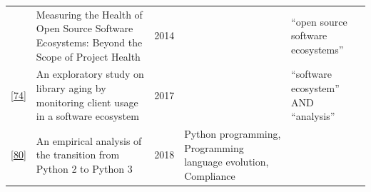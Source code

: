 \documentclass[]{book}
\begin{document}
\begin{longtable}[]{@{}lllll@{}}
\begin{minipage}[t]{0.05\columnwidth}
\end{minipage} & \begin{minipage}[t]{0.31\columnwidth}\raggedright\strut
Measuring the Health of Open Source Software Ecosystems: Beyond the
Scope of Project Health\strut
\end{minipage} & \begin{minipage}[t]{0.02\columnwidth}\raggedright\strut
2014\strut
\end{minipage} & \begin{minipage}[t]{0.34\columnwidth}\raggedright\strut
\strut
\end{minipage} & \begin{minipage}[t]{0.13\columnwidth}\raggedright\strut
``open source software ecosystems''\strut
\end{minipage}\tabularnewline
\begin{minipage}[t]{0.05\columnwidth}\raggedright\strut
{[}\protect\hyperlink{ref-Kula2017-2}{74}{]}\strut
\end{minipage} & \begin{minipage}[t]{0.31\columnwidth}\raggedright\strut
An exploratory study on library aging by monitoring client usage in a
software ecosystem\strut
\end{minipage} & \begin{minipage}[t]{0.02\columnwidth}\raggedright\strut
2017\strut
\end{minipage} & \begin{minipage}[t]{0.34\columnwidth}\raggedright\strut
\strut
\end{minipage} & \begin{minipage}[t]{0.13\columnwidth}\raggedright\strut
``software ecosystem'' AND ``analysis''\strut
\end{minipage}\tabularnewline
\begin{minipage}[t]{0.05\columnwidth}\raggedright\strut
{[}\protect\hyperlink{ref-Malloy2018}{80}{]}\strut
\end{minipage} & \begin{minipage}[t]{0.31\columnwidth}\raggedright\strut
An empirical analysis of the transition from Python 2 to Python 3\strut
\end{minipage} & \begin{minipage}[t]{0.02\columnwidth}\raggedright\strut
2018\strut
\end{minipage} & \begin{minipage}[t]{0.34\columnwidth}\raggedright\strut
Python programming, Programming language evolution, Compliance\strut
\end{minipage} & \begin{minipage}[t]{0.13\columnwidth}\raggedright\strut

\end{minipage}
\end{longtable}
\end{document}
